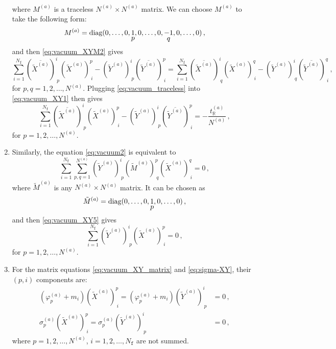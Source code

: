 \documentclass[12pt,a4paper]{article}
\renewcommand{\(}{\left(}
\renewcommand{\)}{\right)}
\renewcommand{\(}{\left(}
\renewcommand{\)}{\right)}
\begin{document}
\begin{enumerate}
\begin{align}
\label{eq:vacuum_XYM2}
\end{align}
where $M^{(a)}$ is a traceless $N^{(a)}\times N^{(a)}$  matrix.
We can choose $M^{(a)}$ to take the following form:
\begin{equation}
M^{(a)}=\textrm{diag}(0,\dots,0, \stackunder{$1$}{$p$},0,\dots, 0,\stackunder{$-1$}{$q$},0,\dots,0)  \,,
\end{equation}
and then \eqref{eq:vacuum_XYM2} gives 
\begin{equation}\label{eq:vacuum_traceless}
\sum_{i=1}^{N_\mathtt{f}}(\overline{\tilde{X}^{(a)}})^i_{\ p} (\tilde{X}^{(a)})^p_{\ i}-(\tilde{Y}^{(a)})^i_{\ p} (\overline{\tilde{Y}^{(a)}})^p_{\ i}=\sum_{i=1}^{N_\mathtt{f}}(\overline{\tilde{X}^{(a)}})^i_{\ q} (\tilde{X}^{(a)})^q_{\ i}-(\tilde{Y}^{(a)})^i_{\ q} (\overline{\tilde{Y}^{(a)}})^q_{\ i}\,,
\end{equation}
for $p, q = 1,2,\dots, N^{(a)}$.
Plugging \eqref{eq:vacuum_traceless} into \eqref{eq:vacuum_XY1} then gives
\begin{equation}\label{eq:vacuum_XY4}
\sum_{i=1}^{N_\mathtt{f}}(\overline{\tilde{X}^{(a)}})^i_{\ p} (\tilde{X}^{(a)})^p_{\ i}-(\tilde{Y}^{(a)})^i_{\ p} (\overline{\tilde{Y}^{(a)}})^p_{\ i}=-\frac{t^{(a)}_\mathbb{R}}{N^{(a)}}\,, 
\end{equation}
for $p=1,2,\dots,N^{(a)}$. 


\item Similarly, the equation \eqref{eq:vacuum2} is equivalent to 
\begin{equation}\label{eq:vacuum_XY5}
\sum_{i=1}^{N_\mathtt{f}}\sum^{N^{(a)}}_{p,q=1}(\tilde{Y}^{(a)})^i_{\ p} (\tilde{M}^{(a)})^p_{\ q} (\tilde{X}^{(a)})^q_{\ i}=0\,,
\end{equation}
where $\tilde{M}^{(a)}$ is any $N^{(a)}\times N^{(a)}$ matrix. 
It can be chosen as
\begin{equation}
\tilde{M}^{(a)}=\textrm{diag}(0,\dots,0, \stackunder{$1$}{$p$},0,\dots,0)  \,,  
\end{equation}
and then \eqref{eq:vacuum_XY5} gives
\begin{equation}\label{eq:vacuum_xy3}
\sum_{i=1}^{N_\mathtt{f}}(\tilde{Y}^{(a)})^i_{\ p}  (\tilde{X}^{(a)})^p_{\ i}=0\,,   
\end{equation}
for $p=1,2,\dots,N^{(a)}$.

\item For the matrix equations \eqref{eq:vacuum_XY_matrix} and \eqref{eq:sigma-XY}, their $(p,i)$ components are:
\begin{align}
(\varphi^{(a)}_p+m_i)(\tilde{X}^{(a)})^p_{\ i}=(\varphi^{(a)}_p+m_i)(\tilde{Y}^{(a)})^i_{\ p}&=0\,,
\label{eq:vacuum_XY2}\\
\sigma^{(a)}_p(\tilde{X}^{(a)})^p_{\ i}=\sigma^{(a)}_p(\tilde{Y}^{(a)})^i_{\ p}&=0\,,\label{eq:vacuum_sigma_XY1}
\end{align}
where $p=1,2,\dots,N^{(a)}$, $i=1,2,\dots,N_{\mathtt{f}}$ are not summed. 


\end{enumerate}
\end{document}

